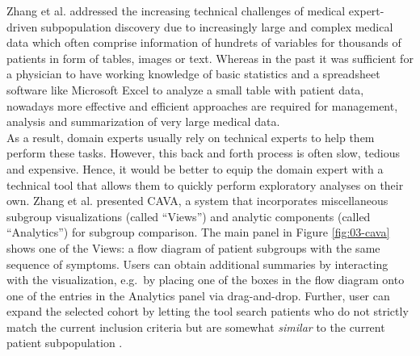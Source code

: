 \documentclass[
  oneside]{book}
\begin{document}
Zhang et al. \autocite{Zhang:CAVA2015} addressed the increasing technical challenges of medical expert-driven subpopulation discovery due to increasingly large and complex medical data which often comprise information of hundrets of variables for thousands of patients in form of tables, images or text.
Whereas in the past it was sufficient for a physician to have working knowledge of basic statistics and a spreadsheet software like Microsoft Excel to analyze a small table with patient data, nowadays more effective and efficient approaches are required for management, analysis and summarization of very large medical data.\\
As a result, domain experts usually rely on technical experts to help them perform these tasks.
However, this back and forth process is often slow, tedious and expensive.
Hence, it would be better to equip the domain expert with a technical tool that allows them to quickly perform exploratory analyses on their own.
Zhang et al. \autocite{Zhang:CAVA2015} presented CAVA, a system that incorporates miscellaneous subgroup visualizations (called ``Views'') and analytic components (called ``Analytics'') for subgroup comparison.
The main panel in Figure \ref{fig:03-cava} shows one of the Views: a flow diagram \autocite{wongsuphasawat2012exploring} of patient subgroups with the same sequence of symptoms.
Users can obtain additional summaries by interacting with the visualization, e.g.~by placing one of the boxes in the flow diagram onto one of the entries in the Analytics panel via drag-and-drop.
Further, user can expand the selected cohort by letting the tool search patients who do not strictly match the current inclusion criteria but are somewhat \emph{similar} to the current patient subpopulation \autocite{ebadollahi2010predicting}.
\end{document}
